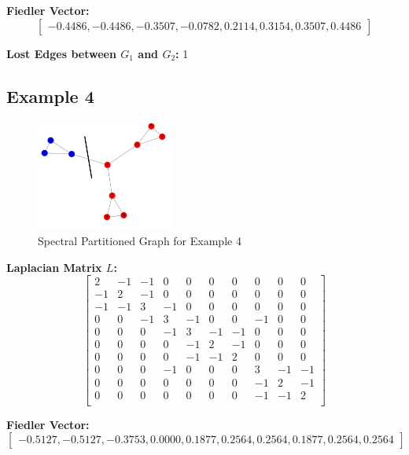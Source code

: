 \documentclass[hidelinks,12pt]{article}
\begin{document}
\noindent\textbf{Fiedler Vector:}
\[
\begin{bmatrix}
-0.4486, -0.4486, -0.3507, -0.0782, 0.2114, 0.3154, 0.3507, 0.4486
\end{bmatrix}
\]

\noindent\textbf{Lost Edges between \(G_1\) and \(G_2\):} 1
\newpage
\subsection*{Example 4}

\begin{figure}[h!]
\centering
\includegraphics[width=0.4\textwidth]{figures/image11.png}
\caption{Spectral Partitioned Graph for Example 4}
\end{figure}

\noindent\textbf{Laplacian Matrix \(L\):}
\[
\begin{bmatrix}
2 & -1 & -1 &  0 &  0 &  0 &  0 &  0 &  0 &  0 \\
-1 & 2 & -1 &  0 &  0 &  0 &  0 &  0 &  0 &  0 \\
-1 & -1 & 3 & -1 &  0 &  0 &  0 &  0 &  0 &  0 \\
0 & 0 & -1 & 3 & -1 &  0 &  0 & -1 & 0 & 0 \\
0 & 0 & 0 & -1 & 3 & -1 & -1 & 0 & 0 & 0 \\
0 & 0 & 0 & 0 & -1 & 2 & -1 & 0 & 0 & 0 \\
0 & 0 & 0 & 0 & -1 & -1 & 2 & 0 & 0 & 0 \\
0 & 0 & 0 & -1 & 0 & 0 & 0 & 3 & -1 & -1 \\
0 & 0 & 0 & 0 & 0 & 0 & 0 & -1 & 2 & -1 \\
0 & 0 & 0 & 0 & 0 & 0 & 0 & -1 & -1 & 2 \\
\end{bmatrix}
\]

\noindent\textbf{Fiedler Vector:}
\[
\begin{bmatrix}
-0.5127, -0.5127, -0.3753, 0.0000, 0.1877, 0.2564, 0.2564, 0.1877, 0.2564, 0.2564
\end{bmatrix}
\]
\end{document}
